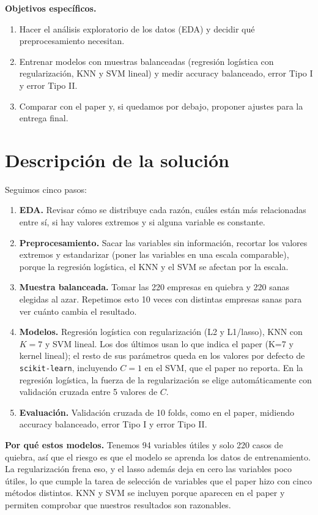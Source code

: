 \documentclass[11pt,a4paper]{article}
\begin{document}
\textbf{Objetivos específicos.}
\begin{enumerate}[leftmargin=1.5em]
    \item Hacer el análisis exploratorio de los datos (EDA) y decidir qué preprocesamiento necesitan.
    \item Entrenar modelos con muestras balanceadas (regresión logística con regularización, KNN y SVM lineal) y medir accuracy balanceado, error Tipo I y error Tipo II.
    \item Comparar con el paper y, si quedamos por debajo, proponer ajustes para la entrega final.
\end{enumerate}

\section{Descripción de la solución}

Seguimos cinco pasos:

\begin{enumerate}[leftmargin=1.5em]
    \item \textbf{EDA.} Revisar cómo se distribuye cada razón, cuáles están más relacionadas entre sí, si hay valores extremos y si alguna variable es constante.
    \item \textbf{Preprocesamiento.} Sacar las variables sin información, recortar los valores extremos y estandarizar (poner las variables en una escala comparable), porque la regresión logística, el KNN y el SVM se afectan por la escala.
    \item \textbf{Muestra balanceada.} Tomar las 220 empresas en quiebra y 220 sanas elegidas al azar. Repetimos esto 10 veces con distintas empresas sanas para ver cuánto cambia el resultado.
    \item \textbf{Modelos.} Regresión logística con regularización (L2 y L1/lasso), KNN con $K=7$ y SVM lineal. Los dos últimos usan lo que indica el paper (K=7 y kernel lineal); el resto de sus parámetros queda en los valores por defecto de \texttt{scikit-learn}, incluyendo $C=1$ en el SVM, que el paper no reporta. En la regresión logística, la fuerza de la regularización se elige automáticamente con validación cruzada entre 5 valores de $C$.
    \item \textbf{Evaluación.} Validación cruzada de 10 folds, como en el paper, midiendo accuracy balanceado, error Tipo I y error Tipo II.
\end{enumerate}

\textbf{Por qué estos modelos.} Tenemos 94 variables útiles y solo 220 casos de quiebra, así que el riesgo es que el modelo se aprenda los datos de entrenamiento. La regularización frena eso, y el lasso además deja en cero las variables poco útiles, lo que cumple la tarea de selección de variables que el paper hizo con cinco métodos distintos. KNN y SVM se incluyen porque aparecen en el paper y permiten comprobar que nuestros resultados son razonables.
\end{document}

